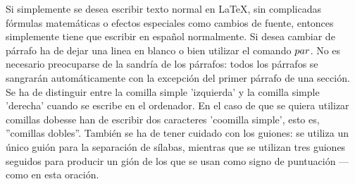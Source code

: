 \documentclass[a4paper, 10pt]{letter}
\begin{document}
Si simplemente se desea escribir texto normal en LaTeX,
sin complicadas fórmulas matemáticas o efectos especiales
como cambios de fuente, entonces simplemente tiene que escribir
en español normalmente.
Si desea cambiar de párrafo ha de dejar una linea en blanco o bien
utilizar el comando $\\par$.
No es necesario preocuparse de la sandría de los párrafos:
todos los párrafos se sangrarán automáticamente con la excepción
del primer párrafo de una sección.
Se ha de distinguir entre la comilla simple 'izquierda'
y la comilla simple 'derecha' cuando se escribe en el ordenador.
En el caso de que se quiera utilizar comillas dobesse han de escribir
dos caracteres 'coomilla simple', esto es, 
''comillas dobles''.
También se ha de tener cuidado con los guiones: se utiliza un único
guión para la separación de sílabas, mientras que se utilizan 
tres guiones seguidos para producir un gión de los que se usan 
como signo de puntuación --- como en esta oración.
\end{document}
